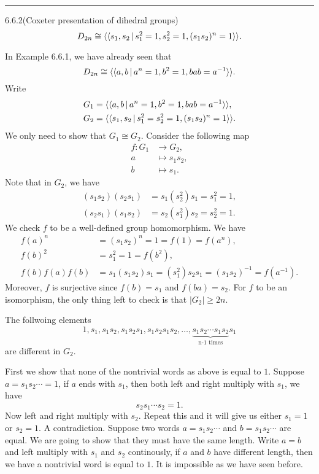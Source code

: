\documentclass[a4paper, 12pt]{article}
\begin{document}
\noindent\rule{7in}{2.8pt}
\begin{problem}{6.6.2(Coxeter presentation of dihedral groups)}
\[D_{2n}\cong \langle\langle s_1,s_2\,|\, s_1^2=1,s_2^2=1,(s_1s_2)^n=1\rangle\rangle. \]
\end{problem}
\begin{solution}
In Example 6.6.1, we have already seen that 
\[D_{2n}\cong \langle\langle a,b\,|\, a^n=1,b^2=1,bab=a^{-1}\rangle\rangle.\]
Write
\begin{align*}
G_1&=\langle\langle a,b\,|\, a^n=1,b^2=1,bab=a^{-1}\rangle\rangle,\\ 
G_2&= \langle\langle s_1,s_2\,|\, s_1^2=s_2^2=1, (s_1s_2)^n=1\rangle\rangle.
\end{align*}
We only need to show that \(G_1\cong G_2\).
Consider the following map 
\begin{align*}
    f:G_1&\rightarrow G_2,\\ 
    a&\mapsto s_1s_2,\\ 
    b&\mapsto s_1.
\end{align*}
Note that in \(G_2\), we have 
\begin{align*}
(s_1s_2)(s_2s_1)&=s_1(s_2^2)s_1=s_1^2=1,\\ 
(s_2s_1)(s_1s_2)&=s_2(s_1^2)s_2=s_2^2=1.
\end{align*}
We check \(f\) to be a well-defined group homomorphism. We have 
\begin{align*}
f(a)^n&=(s_1s_2)^n=1=f(1)=f(a^n),\\ 
f(b)^2&=s_1^2=1=f(b^2),\\ 
f(b)f(a)f(b)&=s_1(s_1s_2)s_1=(s_1^2)s_2s_1=(s_1s_2)^{-1}=f(a^{-1}).
\end{align*} 
Moreover, \(f\) is surjective since \(f(b)=s_1\) and \(f(ba)=s_2\). For \(f\) to be an isomorphism, the only thing left to check is that \(|G_2|\geq 2n\). 
\begin{claim}
 The follwoing elements 
 \[1,s_1,s_1s_2,s_1s_2s_1,s_1s_2s_1s_2,\ldots, \underbrace{s_1s_2\cdots s_1s_2}_\text{n-1 times}s_1\]
 are different in \(G_2\).   
\end{claim}
\begin{claimproof}
First we show that none of the nontrivial words as above is equal to \(1\). Suppose \(a=s_1s_2\cdots=1\), if \(a\) ends with \(s_1\), then both left and right multiply with \(s_1\), we have 
\[s_2s_1\cdots s_2=1.\]
Now left and right multiply with \(s_2\). Repeat this and it will give us either \(s_1=1\) or \(s_2=1\). A contradiction. Suppose two words \(a=s_1s_2\cdots\) and \(b=s_1s_2\cdots\) are equal. We are 
going to show that they must have the same length. Write \(a=b\) and left multiply with \(s_1\) and \(s_2\) continously, if \(a\) and \(b\) have different length, then we have a nontrivial word is equal to \(1\). It is 
impossible as we have seen before.  
\end{claimproof}
\end{solution}
\end{document}
